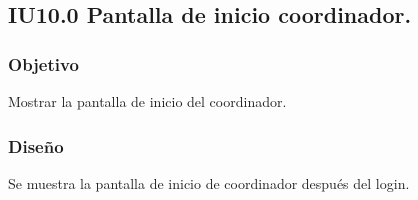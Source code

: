 \subsection{IU10.0 Pantalla de inicio coordinador.}

\subsubsection{Objetivo}
	Mostrar la pantalla de inicio del coordinador.

\subsubsection{Diseño}
  Se muestra la pantalla de inicio de coordinador después del login.
